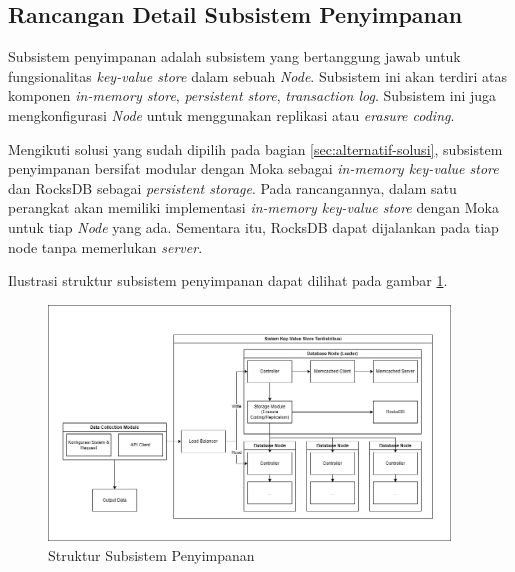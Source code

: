 \subsection{Rancangan Detail Subsistem Penyimpanan}
\label{subsection:detail-subsistem-penyimpanan}

Subsistem penyimpanan adalah subsistem yang bertanggung jawab untuk fungsionalitas \textit{key-value store} dalam sebuah \textit{Node}. Subsistem ini akan terdiri atas komponen \textit{in-memory store}, \textit{persistent store}, \textit{transaction log}. Subsistem ini juga mengkonfigurasi \textit{Node} untuk menggunakan replikasi atau \textit{erasure coding}.

Mengikuti solusi yang sudah dipilih pada bagian \ref{sec:alternatif-solusi}, subsistem penyimpanan bersifat modular dengan Moka sebagai \textit{in-memory key-value store} dan RocksDB sebagai \textit{persistent storage}. Pada rancangannya, dalam satu perangkat akan memiliki implementasi \textit{in-memory key-value store} dengan Moka untuk tiap \textit{Node} yang ada. Sementara itu, RocksDB dapat dijalankan pada tiap node tanpa memerlukan \textit{server}.

Ilustrasi struktur subsistem penyimpanan dapat dilihat pada gambar \ref{fig:storage-subsystem-structure}.

\begin{figure}[ht]
    \centering
    \includegraphics[width=0.95\textwidth]{resources/chapter-3/general-architecture.png}
    \caption{Struktur Subsistem Penyimpanan}
    \label{fig:storage-subsystem-structure}
\end{figure}
